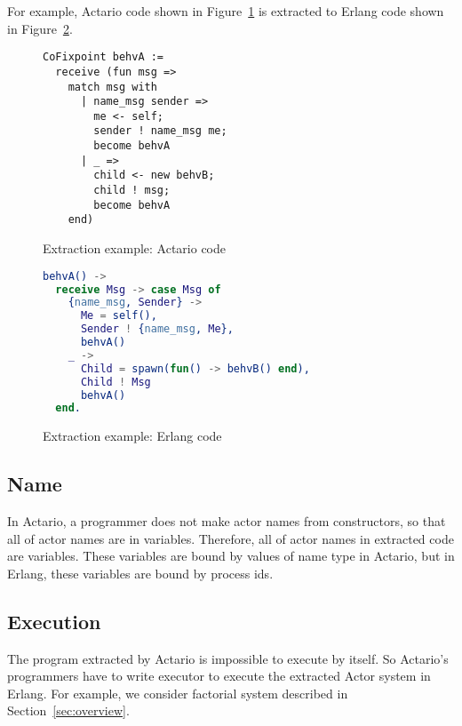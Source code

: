 For example, Actario code shown in Figure~\ref{coq:extractionex} is extracted to Erlang code shown in Figure~\ref{erl:extractionex}.

\begin{figure}[t]
  \begin{lstlisting}
CoFixpoint behvA :=
  receive (fun msg =>
    match msg with
      | name_msg sender =>
        me <- self;
        sender ! name_msg me;
        become behvA
      | _ =>
        child <- new behvB;
        child ! msg;
        become behvA
    end)
  \end{lstlisting}
  \caption{Extraction example: Actario code}\label{coq:extractionex}
\end{figure}

\begin{figure}[t]
  \begin{lstlisting}[language=erlang]
behvA() ->
  receive Msg -> case Msg of
    {name_msg, Sender} ->
      Me = self(),
      Sender ! {name_msg, Me},
      behvA()
    _ ->
      Child = spawn(fun() -> behvB() end),
      Child ! Msg
      behvA()
  end.
  \end{lstlisting}
  \caption{Extraction example: Erlang code}\label{erl:extractionex}
\end{figure}

\subsection{Name}
In Actario, a programmer does not make actor names from constructors, so that all of actor names are in variables.
Therefore, all of actor names in extracted code are variables.
These variables are bound by values of name type in Actario, but in Erlang, these variables are bound by process ids.

\subsection{Execution}
The program extracted by Actario is impossible to execute by itself.
So Actario's programmers have to write executor to execute the extracted Actor system in Erlang.
For example, we consider factorial system described in Section~\ref{sec:overview}.

